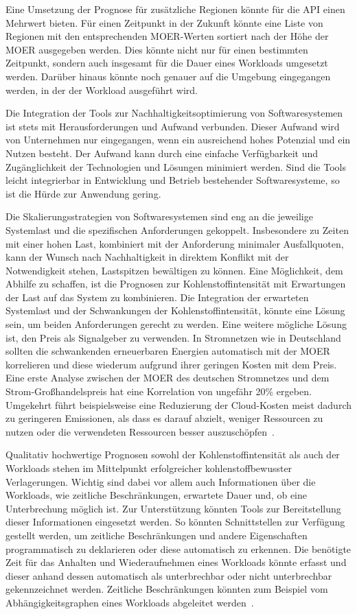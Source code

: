 Eine Umsetzung der Prognose für zusätzliche Regionen könnte für die \ac{API} einen Mehrwert bieten.
Für einen Zeitpunkt in der Zukunft könnte eine Liste von Regionen mit den entsprechenden \ac{MOER}-Werten sortiert nach der Höhe der \ac{MOER} ausgegeben werden.
Dies könnte nicht nur für einen bestimmten Zeitpunkt, sondern auch insgesamt für die Dauer eines Workloads umgesetzt werden.
Darüber hinaus könnte noch genauer auf die Umgebung eingegangen werden, in der der Workload ausgeführt wird.

Die Integration der Tools zur Nachhaltigkeitsoptimierung von Softwaresystemen ist stets mit Herausforderungen und Aufwand verbunden.
Dieser Aufwand wird von Unternehmen nur eingegangen, wenn ein ausreichend hohes Potenzial und ein Nutzen besteht.
Der Aufwand kann durch eine einfache Verfügbarkeit und Zugänglichkeit der Technologien und Lösungen minimiert werden.
Sind die Tools leicht integrierbar in Entwicklung und Betrieb bestehender Softwaresysteme, so ist die Hürde zur Anwendung gering.

Die Skalierungsstrategien von Softwaresystemen sind eng an die jeweilige Systemlast und die spezifischen Anforderungen gekoppelt.
Insbesondere zu Zeiten mit einer hohen Last, kombiniert mit der Anforderung minimaler Ausfallquoten, kann der Wunsch nach Nachhaltigkeit in direktem Konflikt mit der Notwendigkeit stehen, Lastspitzen bewältigen zu können.
Eine Möglichkeit, dem Abhilfe zu schaffen, ist die Prognosen zur Kohlenstoffintensität mit Erwartungen der Last auf das System zu kombinieren.
Die Integration der erwarteten Systemlast und der Schwankungen der Kohlenstoffintensität, könnte eine Lösung sein, um beiden Anforderungen gerecht zu werden.
Eine weitere mögliche Lösung ist, den Preis als Signalgeber zu verwenden.
In Stromnetzen wie in Deutschland sollten die schwankenden erneuerbaren Energien automatisch mit der \ac{MOER} korrelieren und diese wiederum aufgrund ihrer geringen Kosten mit dem Preis.
Eine erste Analyse zwischen der \ac{MOER} des deutschen Stromnetzes und dem Strom-Großhandelspreis hat eine Korrelation von ungefähr 20\% ergeben.
Umgekehrt führt beispielsweise eine Reduzierung der Cloud-Kosten meist dadurch zu geringeren Emissionen, als dass es darauf abzielt, weniger Ressourcen zu nutzen oder die verwendeten Ressourcen besser auszuschöpfen~\cite{Thoughtworks.2020}.

Qualitativ hochwertige Prognosen sowohl der Kohlenstoffintensität als auch der Workloads stehen im Mittelpunkt erfolgreicher kohlenstoffbewusster Verlagerungen.
Wichtig sind dabei vor allem auch Informationen über die Workloads, wie zeitliche Beschränkungen, erwartete Dauer und, ob eine Unterbrechung möglich ist.
Zur Unterstützung könnten Tools zur Bereitstellung dieser Informationen eingesetzt werden.
So könnten Schnittstellen zur Verfügung gestellt werden, um zeitliche Beschränkungen und andere Eigenschaften programmatisch zu deklarieren oder diese automatisch zu erkennen.
Die benötigte Zeit für das Anhalten und Wiederaufnehmen eines Workloads könnte erfasst und dieser anhand dessen automatisch als unterbrechbar oder nicht unterbrechbar gekennzeichnet werden.
Zeitliche Beschränkungen könnten zum Beispiel vom Abhängigkeitsgraphen eines Workloads abgeleitet werden~\cite{Wiesner.2021}.

